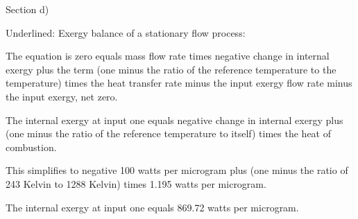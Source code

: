 Section d)

Underlined: Exergy balance of a stationary flow process:

The equation is zero equals mass flow rate times negative change in internal exergy plus the term (one minus the ratio of the reference temperature to the temperature) times the heat transfer rate minus the input exergy flow rate minus the input exergy, net zero.

The internal exergy at input one equals negative change in internal exergy plus (one minus the ratio of the reference temperature to itself) times the heat of combustion.

This simplifies to negative 100 watts per microgram plus (one minus the ratio of 243 Kelvin to 1288 Kelvin) times 1.195 watts per microgram.

The internal exergy at input one equals 869.72 watts per microgram.